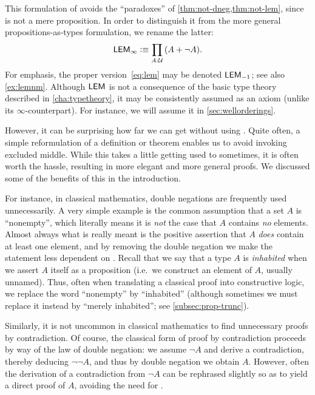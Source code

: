 This formulation of \LEM{} avoids the ``paradoxes'' of \autoref{thm:not-dneg,thm:not-lem}, since \bool is not a mere proposition.
In order to distinguish it from the more general propositions-as-types formulation, we rename the latter:
\begin{equation*}
  \LEM\infty \defeq \prd{A:\UU} (A + \neg A).
\end{equation*}
For emphasis, the proper version~\eqref{eq:lem}
may be denoted $\mathsf{LEM}_{-1}$;
see also \autoref{ex:lemnm}.
Although $\mathsf{LEM}_{}$
is not a consequence of the basic type theory described in \autoref{cha:typetheory}, it may be consistently assumed as an axiom (unlike its $\infty$-counterpart).
For instance, we will assume it in \autoref{sec:wellorderings}.

However, it can be surprising how far we can get without using \LEM{}.
Quite often, a simple reformulation of a definition or theorem enables us to avoid invoking excluded middle.
While this takes a little getting used to sometimes, it is often worth the hassle, resulting in more elegant and more general proofs.
We discussed some of the benefits of this in the introduction.

For instance, in classical mathematics, double negations are frequently used unnecessarily.
A very simple example is the common assumption that a set $A$ is ``nonempty'', which literally means it is \emph{not} the case that $A$ contains \emph{no} elements.
Almost always what is really meant is the positive assertion that $A$ \emph{does} contain at least one element, and by removing the double negation we make the statement less dependent on \LEM{}.
Recall that we say that a type $A$ is \emph{inhabited}
%
when we assert $A$ itself as a proposition (i.e.\ we construct an element of $A$, usually unnamed).
Thus, often when translating a classical proof into constructive logic, we replace the word ``nonempty'' by ``inhabited'' (although sometimes we must replace it instead by ``merely inhabited''; see \autoref{subsec:prop-trunc}).

Similarly, it is not uncommon in classical mathematics to find unnecessary proofs by contradiction.
%
Of course, the classical form of proof by contradiction proceeds by way of the law of double negation: we assume $\neg A$ and derive a contradiction, thereby deducing $\neg \neg A$, and thus by double negation we obtain $A$.
However, often the derivation of a contradiction from $\neg A$ can be rephrased slightly so as to yield a direct proof of $A$, avoiding the need for \LEM{}.

